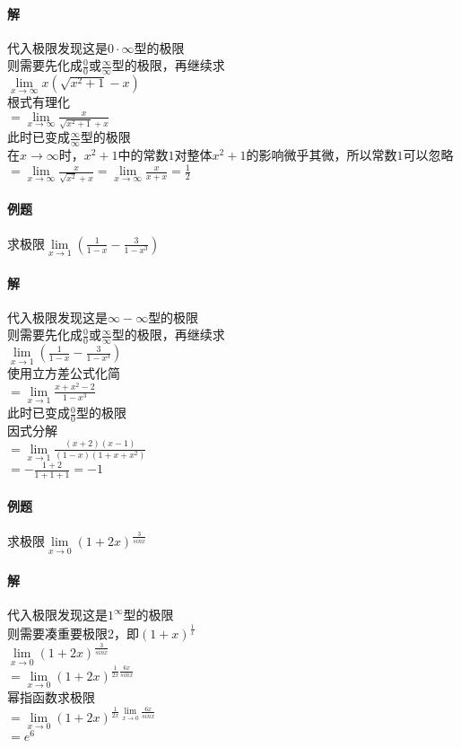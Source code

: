 \documentclass{article}
\begin{document}
\begin{flushleft}
	\paragraph{解}
	代入极限发现这是$0\cdot\infty$型的极限\\
	则需要先化成$\frac{0}{0}$或$\frac{\infty}{\infty}$型的极限，再继续求\\
	$\lim\limits_{x\to \infty}x(\sqrt{x^2+1}-x)$\\
	根式有理化\\
	$=\lim\limits_{x\to \infty}\frac{x}{\sqrt{x^2+1}+x}$\\
	此时已变成$\frac{\infty}{\infty}$型的极限\\
	在$x\to\infty$时，$x^2+1$中的常数$1$对整体$x^2+1$的影响微乎其微，所以常数$1$可以忽略\\
	$=\lim\limits_{x\to \infty}\frac{x}{\sqrt{x^2}+x}
	=\lim\limits_{x\to \infty}\frac{x}{x+x}=\frac{1}{2}$\\
	
	\paragraph{例题}
	求极限$\lim\limits_{x\to 1}(\frac{1}{1-x}-\frac{3}{1-x^3})$
	\paragraph{解}
	代入极限发现这是$\infty-\infty$型的极限\\
	则需要先化成$\frac{0}{0}$或$\frac{\infty}{\infty}$型的极限，再继续求\\
	$\lim\limits_{x\to 1}(\frac{1}{1-x}-\frac{3}{1-x^3})$\\
	使用立方差公式化简\\
	$=\lim\limits_{x\to 1}\frac{x+x^2-2}{1-x^3}$\\
	此时已变成$\frac{0}{0}$型的极限\\
	因式分解\\
	$=\lim\limits_{x\to 1}\frac{(x+2)(x-1)}{(1-x)(1+x+x^2)}$\\
	$=-\frac{1+2}{1+1+1}=-1$\\
	
	\paragraph{例题}
	求极限$\lim\limits_{x\to 0}(1+2x)^{\frac{3}{sinx}}$
	\paragraph{解}
	代入极限发现这是$1^\infty$型的极限\\
	则需要凑重要极限2，即$(1+x)^{\frac{1}{x}}$\\
	$\lim\limits_{x\to 0}(1+2x)^{\frac{3}{sinx}}$\\
	$=\lim\limits_{x\to 0}(1+2x)^{\frac{1}{2x}\frac{6x}{sinx}}$\\
	幂指函数求极限\\
	$=\lim\limits_{x\to 0}(1+2x)^{\frac{1}{2x}\lim\limits_{x\to 0}\frac{6x}{sinx}}$\\
	$=e^6$\\

\end{flushleft}
\end{document}
